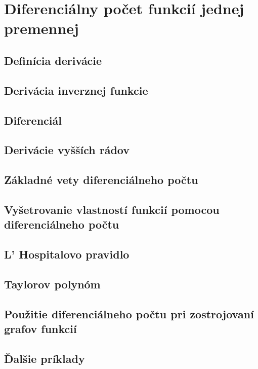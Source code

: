 \chapter[Diferenciálny počet]{Diferenciálny počet funkcií jednej premennej}

\section{Definícia derivácie}


\section{Derivácia inverznej funkcie}


\section{Diferenciál}


\section{Derivácie vyšších rádov}


\section{Základné vety diferenciálneho počtu}


\section[Vyšetrovanie vlastností funkcií]{Vyšetrovanie vlastností funkcií pomocou diferenciálneho počtu}


\section{L' Hospitalovo pravidlo}


\section{Taylorov polynóm}


\section[Zostrojovanie grafov]{Použitie diferenciálneho počtu pri zostrojovaní grafov funkcií}


\section{Ďalšie príklady}

